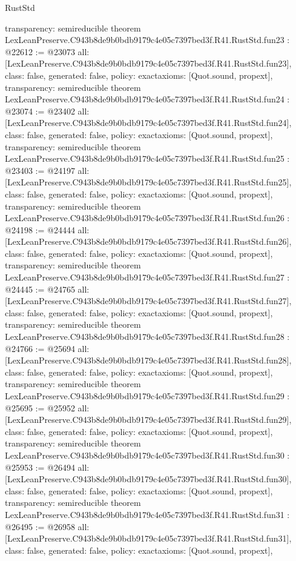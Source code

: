\begin{lexlean}{RustStd}
\begin{coremodule}
{  transparency: semireducible
}
theorem LexLeanPreserve.C943b8de9b0bdb9179c4e05c7397bed3f.R41.RustStd.fun23 : @22612 := @23073 {
  all: [LexLeanPreserve.C943b8de9b0bdb9179c4e05c7397bed3f.R41.RustStd.fun23],
  class: false,
  generated: false,
  policy: exact{axioms: [Quot.sound, propext]},
  transparency: semireducible
}
theorem LexLeanPreserve.C943b8de9b0bdb9179c4e05c7397bed3f.R41.RustStd.fun24 : @23074 := @23402 {
  all: [LexLeanPreserve.C943b8de9b0bdb9179c4e05c7397bed3f.R41.RustStd.fun24],
  class: false,
  generated: false,
  policy: exact{axioms: [Quot.sound, propext]},
  transparency: semireducible
}
theorem LexLeanPreserve.C943b8de9b0bdb9179c4e05c7397bed3f.R41.RustStd.fun25 : @23403 := @24197 {
  all: [LexLeanPreserve.C943b8de9b0bdb9179c4e05c7397bed3f.R41.RustStd.fun25],
  class: false,
  generated: false,
  policy: exact{axioms: [Quot.sound, propext]},
  transparency: semireducible
}
theorem LexLeanPreserve.C943b8de9b0bdb9179c4e05c7397bed3f.R41.RustStd.fun26 : @24198 := @24444 {
  all: [LexLeanPreserve.C943b8de9b0bdb9179c4e05c7397bed3f.R41.RustStd.fun26],
  class: false,
  generated: false,
  policy: exact{axioms: [Quot.sound, propext]},
  transparency: semireducible
}
theorem LexLeanPreserve.C943b8de9b0bdb9179c4e05c7397bed3f.R41.RustStd.fun27 : @24445 := @24765 {
  all: [LexLeanPreserve.C943b8de9b0bdb9179c4e05c7397bed3f.R41.RustStd.fun27],
  class: false,
  generated: false,
  policy: exact{axioms: [Quot.sound, propext]},
  transparency: semireducible
}
theorem LexLeanPreserve.C943b8de9b0bdb9179c4e05c7397bed3f.R41.RustStd.fun28 : @24766 := @25694 {
  all: [LexLeanPreserve.C943b8de9b0bdb9179c4e05c7397bed3f.R41.RustStd.fun28],
  class: false,
  generated: false,
  policy: exact{axioms: [Quot.sound, propext]},
  transparency: semireducible
}
theorem LexLeanPreserve.C943b8de9b0bdb9179c4e05c7397bed3f.R41.RustStd.fun29 : @25695 := @25952 {
  all: [LexLeanPreserve.C943b8de9b0bdb9179c4e05c7397bed3f.R41.RustStd.fun29],
  class: false,
  generated: false,
  policy: exact{axioms: [Quot.sound, propext]},
  transparency: semireducible
}
theorem LexLeanPreserve.C943b8de9b0bdb9179c4e05c7397bed3f.R41.RustStd.fun30 : @25953 := @26494 {
  all: [LexLeanPreserve.C943b8de9b0bdb9179c4e05c7397bed3f.R41.RustStd.fun30],
  class: false,
  generated: false,
  policy: exact{axioms: [Quot.sound, propext]},
  transparency: semireducible
}
theorem LexLeanPreserve.C943b8de9b0bdb9179c4e05c7397bed3f.R41.RustStd.fun31 : @26495 := @26958 {
  all: [LexLeanPreserve.C943b8de9b0bdb9179c4e05c7397bed3f.R41.RustStd.fun31],
  class: false,
  generated: false,
  policy: exact{axioms: [Quot.sound, propext]},
}
\end{coremodule}
\end{lexlean}
